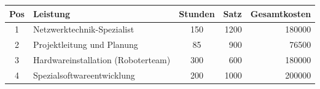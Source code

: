 
                \begin{longtable}{|c|p{6cm}|c|r|r|}
                \hline
                \rowcolor{gray!30}
                \textbf{Pos} & \textbf{Leistung} & \textbf{Stunden} & \textbf{Satz} & \textbf{Gesamtkosten} \\
                \hline
                \endfirsthead
            

                    \hline 
                    1 & Netzwerktechnik-Spezialist & 150 & 1200 & 180000 \\
                    
                    \hline 
                    2 & Projektleitung und Planung & 85 & 900 & 76500 \\
                    
                    \hline 
                    3 & Hardwareinstallation (Roboterteam) & 300 & 600 & 180000 \\
                    
                    \hline 
                    4 & Spezialsoftwareentwicklung & 200 & 1000 & 200000 \\
                    

                \end{longtable} 
            
